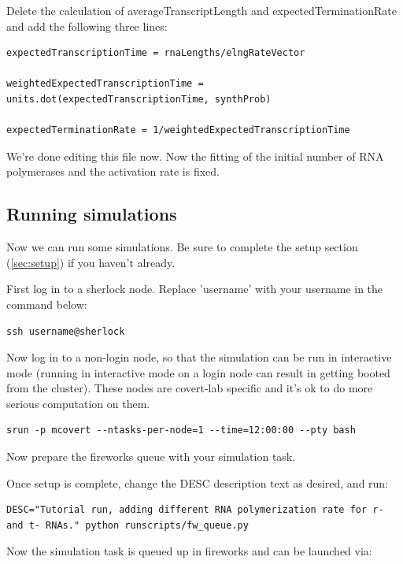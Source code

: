 \documentclass[12pt]{article}
\begin{document}
Delete the calculation of averageTranscriptLength and expectedTerminationRate and add the following three lines:

\begin{lstlisting}
expectedTranscriptionTime = rnaLengths/elngRateVector

weightedExpectedTranscriptionTime = units.dot(expectedTranscriptionTime, synthProb)

expectedTerminationRate = 1/weightedExpectedTranscriptionTime
\end{lstlisting}

We’re done editing this file now. Now the fitting of the initial number of RNA polymerases and the activation rate is fixed. 




\subsection{Running simulations}

Now we can run some simulations. Be sure to complete the setup section (\ref{sec:setup}) if you haven't already.
\par
First log in to a sherlock node. Replace 'username' with your username in the command below:

\lstset{language=bash}
\begin{lstlisting}
ssh username@sherlock
\end{lstlisting}

Now log in to a non-login node, so that the simulation can be run in interactive mode (running in interactive mode on a login node can result in getting booted from the cluster). These nodes are covert-lab specific and it's ok to do more serious computation on them.

\begin{lstlisting}
srun -p mcovert --ntasks-per-node=1 --time=12:00:00 --pty bash
\end{lstlisting}

Now prepare the fireworks queue with your simulation task. 
\par
Once setup is complete, change the DESC description text as desired, and run:

\begin{lstlisting}
DESC="Tutorial run, adding different RNA polymerization rate for r- and t- RNAs." python runscripts/fw_queue.py
\end{lstlisting}

Now the simulation task is queued up in fireworks and can be launched via:
\end{document}
